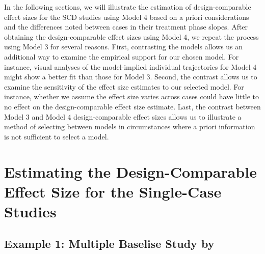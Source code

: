 \documentclass[
]{book}
\begin{document}
In the following sections, we will illustrate the estimation of design-comparable effect sizes for the SCD studies using Model 4 based on a priori considerations and the differences noted between cases in their treatment phase slopes. After obtaining the design-comparable effect sizes using Model 4, we repeat the process using Model 3 for several reasons. First, contrasting the models allows us an additional way to examine the empirical support for our chosen model. For instance, visual analyses of the model-implied individual trajectories for Model 4 might show a better fit than those for Model 3. Second, the contrast allows us to examine the sensitivity of the effect size estimates to our selected model. For instance, whether we assume the effect size varies across cases could have little to no effect on the design-comparable effect size estimate. Last, the contrast between Model 3 and Model 4 design-comparable effect sizes allows us to illustrate a method of selecting between models in circumstances where a priori information is not sufficient to select a model.

\hypertarget{estimating-the-design-comparable-effect-size-for-the-single-case-studies-1}{%
\section{Estimating the Design-Comparable Effect Size for the Single-Case Studies}\label{estimating-the-design-comparable-effect-size-for-the-single-case-studies-1}}

\hypertarget{example-1-multiple-baselise-study-by-gunning2003psychological}{%
\subsection{\texorpdfstring{Example 1: Multiple Baselise Study by \citet{gunning2003Psychological}}{Example 1: Multiple Baselise Study by @gunning2003Psychological}}\label{example-1-multiple-baselise-study-by-gunning2003psychological}}
\end{document}
